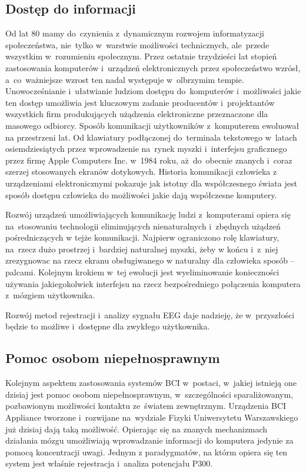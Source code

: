 \documentclass[licencjacka,openright]{pracamgr}
\begin{document}
\subsection{Dostęp do informacji}
Od lat 80 mamy do~czynienia z~dynamicznym rozwojem informatyzacji społeczeństwa, nie~tylko w~warstwie możliwości technicznych, ale~przede wszystkim w~rozumieniu społecznym. Przez ostatnie trzydzieści lat stopień zastosowania komputerów i~urządzeń elektronicznych przez społeczeństwo wzrósł, a~co~ważniejsze wzrost ten nadal występuje w~olbrzymim tempie. Unowocześnianie i~ułatwianie ludziom dostępu do~komputerów i~możliwości jakie ten dostęp umożliwia jest kluczowym zadanie producentów i~projektantów wszystkich firm produkujących użądzenia elektroniczne przeznaczone dla masowego odbiorcy. Sposób komunikacji użytkowników z~komputerem ewoluował na przestrzeni lat. Od klawiatury podłączonej do~terminala tekstowego w~latach osiemdziesiątych przez wprowadzenie na~rynek myszki i~interfejsu graficznego przez firmę Apple Computers Inc. w~1984 roku, aż~do~obecnie znanych i~coraz szerzej stosowanych ekranów dotykowych. Historia komunikacji człowieka z urządzeniami elektronicznymi pokazuje jak istotny dla współczesnego świata jest sposób dostępu człowieka do możliwości jakie dają współczesne komputery.

Rozwój urządzeń umożliwiających komunikację ludzi z~komputerami opiera się na~stosowaniu technologii eliminujących nienaturalnych i~zbędnych użądzeń pośredniczących w tejże komunikacji. Najpierw ograniczono rolę klawiatury, na~rzecz dużo prostrzej i~bardziej naturalnej myszki, żeby w końcu i~z~niej zrezygnowac na rzecz ekranu obsługiwanego w naturalny dla człowieka sposób -- palcami. Kolejnym krokiem w~tej ewolucji jest wyeliminowanie konieczności używania jakiegokolwiek interfejsu na rzecz bezpośredniego połączenia komputera z~mózgiem użytkownika.

Rozwój metod rejestracji i~analizy sygnału EEG daje nadzieję, że w~przyszłości będzie to możliwe i~dostępne dla zwykłego użytkownika.
\subsection{Pomoc osobom niepełnosprawnym}
Kolejnym aspektem zastosowania systemów BCI w~postaci, w~jakiej istnieją one dzisiaj jest pomoc osobom niepełnosprawnym, w~szczególności sparaliżowanym, pozbawionym możliwości kontaktu ze~światem zewnętrznym. Urządzenia BCI Appliance tworzone i~rozwijane na~wydziale Fizyki Uniwersytetu Warszawskiego już dzisiaj dają taką możliwość. Opierając się na znanych mechanizmach działania mózgu umożliwiają wprowadzanie informacji do komputera jedynie za pomocą koncentracji uwagi. Jednym z paradygmatów, na którm opiera się ten system jest właśnie rejestracja i~analiza potencjału P300.
\end{document}
